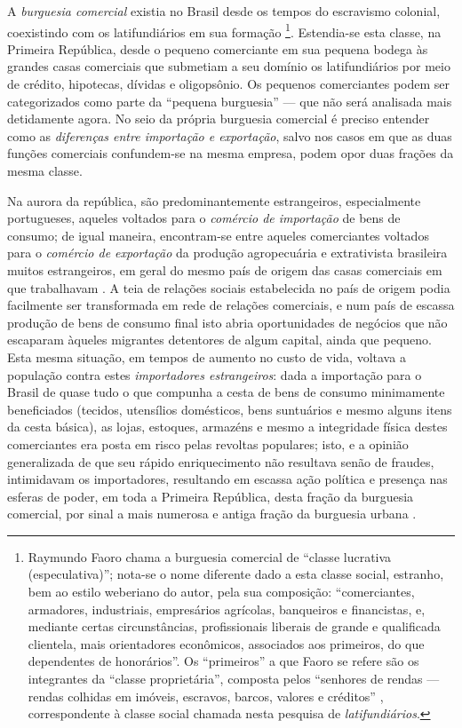 A \textit{burguesia comercial} existia no Brasil desde os tempos do escravismo colonial, coexistindo com os latifundiários em sua formação \cite[p.~237]{faoro_donos_2001} \footnote{Raymundo Faoro chama a burguesia comercial de ``classe lucrativa (especulativa)''; nota-se o nome diferente dado a esta classe social, estranho, bem ao estilo weberiano do autor, pela sua composição: ``comerciantes, armadores, industriais, empresários agrícolas, banqueiros e financistas, e, mediante certas circunstâncias, profissionais liberais de grande e qualificada clientela, mais orientadores econômicos, associados aos primeiros, do que dependentes de honorários''. Os ``primeiros'' a que Faoro se refere são os integrantes da ``classe proprietária'', composta pelos ``senhores de rendas --- rendas colhidas em imóveis, escravos, barcos, valores e créditos'' \cite[p.~237]{faoro_donos_2001}, correspondente à classe social chamada nesta pesquisa de \textit{latifundiários}.}. Estendia-se esta classe, na Primeira República, desde o pequeno comerciante em sua pequena bodega às grandes casas comerciais que submetiam a seu domínio os latifundiários por meio de crédito, hipotecas, dívidas e oligopsônio. Os pequenos comerciantes podem ser categorizados como parte da ``pequena burguesia'' --- que não será analisada mais detidamente agora. No seio da própria burguesia comercial é preciso entender como as \textit{diferenças entre importação e exportação}, salvo nos casos em que as duas funções comerciais confundem-se na mesma empresa, podem opor duas frações da mesma classe. 

Na aurora da república, são predominantemente estrangeiros, especialmente portugueses, aqueles voltados para o \textit{comércio de importação} de bens de consumo; de igual maneira, encontram-se entre aqueles comerciantes voltados para o \textit{comércio de exportação} da produção agropecuária e extrativista brasileira muitos estrangeiros, em geral do mesmo país de origem das casas comerciais em que trabalhavam \cite[p.~158]{CARONE1970inst}. A teia de relações sociais estabelecida no país de origem podia facilmente ser transformada em rede de relações comerciais, e num país de escassa produção de bens de consumo final isto abria oportunidades de negócios que não escaparam àqueles migrantes detentores de algum capital, ainda que pequeno. Esta mesma situação, em tempos de aumento no custo de vida, voltava a população contra estes \textit{importadores estrangeiros}: dada a importação para o Brasil de quase tudo o que compunha a cesta de bens de consumo minimamente beneficiados (tecidos, utensílios domésticos, bens suntuários e mesmo alguns itens da cesta básica), as lojas, estoques, armazéns e mesmo a integridade física destes comerciantes era posta em risco pelas revoltas populares; isto, e a opinião generalizada de que seu rápido enriquecimento não resultava senão de fraudes, intimidavam os importadores, resultando em escassa ação política e presença nas esferas de poder, em toda a Primeira República, desta fração da burguesia comercial, por sinal a mais numerosa e antiga fração da burguesia urbana \cite[pp.~158-159]{CARONE1970inst}.

